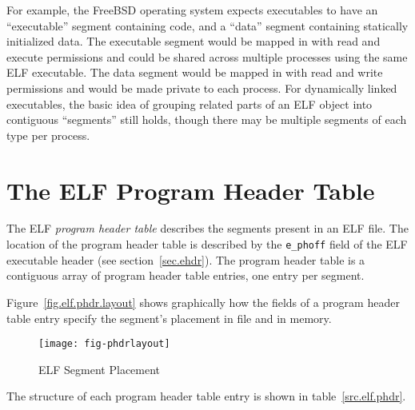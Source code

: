 \documentclass[a4paper,pdftex]{book}
\newcommand{\firstterm}[1]{\textit{#1}}
\newcommand{\parameter}[1]{\texttt{#1}}
\newcommand{\trade}{\texttrademark\xspace}
\begin{document}
For example, the FreeBSD\trade operating system expects
executables to have an ``executable'' segment containing code, and a
``data'' segment containing statically initialized data.%
%
The executable segment would be mapped in with read and execute
permissions and could be shared across multiple processes using the
same ELF executable.  The data segment would be mapped in with read
and write permissions and would be made private to each process.  For
dynamically linked executables, the basic idea of grouping related
parts of an ELF object into contiguous ``segments'' still holds,
though there may be multiple segments of each type per process.

\section{The ELF Program Header Table}

The ELF \firstterm{program header table}
describes the segments present in an ELF file.  The location of the
program header table is described by the \parameter{e\_phoff} field of
the ELF executable header (see section~\vref{sec.ehdr}).  The program
header table is a contiguous array of program header table entries,
one entry per segment.

Figure~\vref{fig.elf.phdr.layout} shows graphically how the fields of
a program header table entry specify the segment's placement in file
and in memory.

\begin{figure}
  \caption{ELF Segment Placement}\label{fig.elf.phdr.layout}
  \begin{center}
    \texttt{[image: fig-phdrlayout]}
  \end{center}
\end{figure}

The structure of each program header table entry is shown in
table~\vref{src.elf.phdr}.
\end{document}
